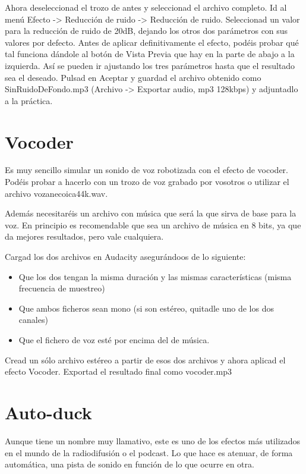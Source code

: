 \documentclass[es,practica]{uah}
\begin{document}
Ahora deseleccionad el trozo de antes y seleccionad el archivo completo. Id al menú Efecto -> Reducción de ruido -> Reducción de ruido. Seleccionad un valor para la reducción de ruido de 20dB, dejando los otros dos parámetros con sus valores por defecto. Antes de aplicar definitivamente el efecto, podéis probar qué tal funciona dándole al botón de Vista Previa que hay en la parte de abajo a la izquierda. Así se pueden ir ajustando los tres parámetros hasta que el resultado sea el deseado. Pulsad en Aceptar y guardad el archivo obtenido como SinRuidoDeFondo.mp3 (Archivo -> Exportar audio, mp3 128kbps) y adjuntadlo a la práctica.

\section{Vocoder}

Es muy sencillo simular un sonido de voz robotizada con el efecto de vocoder. Podéis probar a hacerlo con un trozo de voz grabado por vosotros o utilizar el archivo vozanecoica44k.wav.

Además necesitaréis un archivo con música que será la que sirva de base para la voz. En principio es recomendable que sea un archivo de música en 8 bits, ya que da mejores resultados, pero vale cualquiera. 

Cargad los dos archivos en Audacity asegurándoos de lo siguiente:

\begin{itemize}
	\item Que los dos tengan la misma duración y las mismas características (misma frecuencia de muestreo)
	\item Que ambos ficheros sean mono (si son estéreo, quitadle uno de los dos canales)
	\item Que el fichero de voz esté por encima del de música.
\end{itemize}

Cread un sólo archivo estéreo a partir de esos dos archivos y ahora aplicad el efecto Vocoder. Exportad el resultado final como vocoder.mp3

\section{Auto-duck}

Aunque tiene un nombre muy llamativo, este es uno de los efectos más utilizados en el mundo de la radiodifusión o el podcast. Lo que hace es atenuar, de forma automática, una pista de sonido en función de lo que ocurre en otra. 
\end{document}
